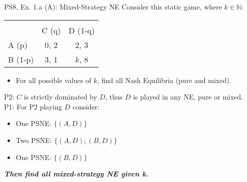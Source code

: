\begin{frame}{PS8, Ex. 1.a (A): Mixed-Strategy NE}
      Consider this static game, where $k\in\mathbb{N}:$
      \vspace{-16pt}
      \begin{table}
        \begin{tabular}{l|c|c|}
          \multicolumn{1}{c}{} & \multicolumn{2}{c}{} \\
          \multicolumn{1}{c}{} & \multicolumn{1}{c}{C (q)} & \multicolumn{1}{c}{\color{blue}D (1-q)} \\\cline{2-3}
          A (p)   & 0, 2 & 2, \color{blue}3 \\\cline{2-3}
          B (1-p) & 3, 1 & $k$, \color{blue}8 \\\cline{2-3}
        \end{tabular}
      \end{table}
      \begin{itemize}
        \item[(a)] For all possible values of $k$, find all Nash Equilibria (pure and mixed).
      \end{itemize}
      P2: $C$ is strictly dominated by $D$, thus $D$ is played in any NE, pure or mixed.\\\medskip
      P1: For P2 playing $D$ consider:
      \begin{itemize}
        \item[$k=$1:] One PSNE: $\{(A,D)\}$
        \item[$k=$2:] Two PSNE: $\{(A,D);(B,D)\}$
        \item[$k\geq$3:] One PSNE: $\{(B,D)\}$
      \end{itemize}
      \textbf{\textit{Then find all mixed-strategy NE given k.}}
      \vfill\null
\end{frame}
